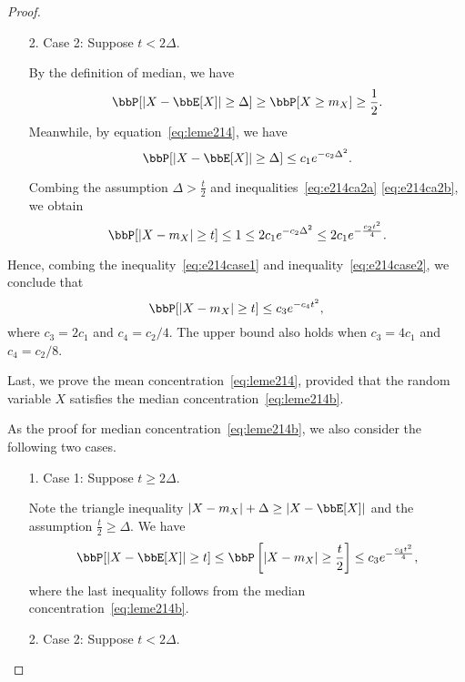 \documentclass[11pt]{article}
\newcommand{\off}[1]{\left[#1\right]}
\theoremstyle{plain}
\theoremstyle{definition}
\begin{document}
\begin{proof}
\begin{enumerate}
		\item[2.] Case 2:   Suppose $t < 2\Delta$. 
		
		\vspace{0.2cm}
		By the definition of median, we have
		\begin{equation}\label{eq:e214ca2a}
			\bbP[|X - \bbE[X]| \geq \Delta] \geq \bbP[X \geq m_X] \geq \frac{1}{2}.
		\end{equation}
		Meanwhile, by equation~\eqref{eq:leme214}, we have
		\begin{equation}\label{eq:e214ca2b}
			\bbP[|X - \bbE[X]| \geq \Delta] \leq c_1 e^{-c_2 \Delta^2}.
		\end{equation}
		
		Combing the assumption $\Delta > \frac{t}{2}$  and inequalities~\eqref{eq:e214ca2a} \eqref{eq:e214ca2b}, we obtain
		\begin{equation}\label{eq:e214case2}
			\bbP[|X - m_X| \geq t]\leq 1\leq 2c_1  e^{-c_2 \Delta^2} \leq 2c_1  e^{-\frac{c_2 t^2}{4}}. 
		\end{equation}
		
	\end{enumerate}
	
	Hence, combing the inequality~\eqref{eq:e214case1} and inequality~\eqref{eq:e214case2}, we conclude that
	\begin{equation}
		\bbP[|X - m_X| \geq t] \leq c_3 e^{-c_4 t^2}, 
	\end{equation}
	where $c_3 = 2c_1$ and $c_4 = c_2/4$. The upper bound also holds when $c_3 = 4 c_1$ and $c_4 = c_2/8$.
	
	\vspace{0.2cm}
	
	Last, we prove the mean concentration~\eqref{eq:leme214}, provided that the random variable $X$ satisfies the median concentration~\eqref{eq:leme214b}. 
	
	\vspace{0.2cm}
	
	As the proof for median concentration~\eqref{eq:leme214b}, we also consider the following two cases.
	\begin{enumerate}
		\item[1.] Case 1: Suppose $t \geq 2\Delta$.
		
		\vspace{0.2cm}
		Note the triangle inequality $|X - m_X| + \Delta \geq |X - \bbE[X]|$ and the assumption $\frac{t}{2} \geq \Delta$. We have
		\begin{equation}
			\bbP[|X - \bbE[X]| \geq t ] \leq \bbP \off{|X - m_X| \geq \frac{t}{2}} \leq c_3 e^{-\frac{c_4 t^2}{4}},
		\end{equation}
		where the last inequality follows from the median concentration~\eqref{eq:leme214b}.
		
		\item[2.] Case 2: Suppose $t < 2\Delta$.
	\end{enumerate}
	\end{proof}
	
\end{document}
